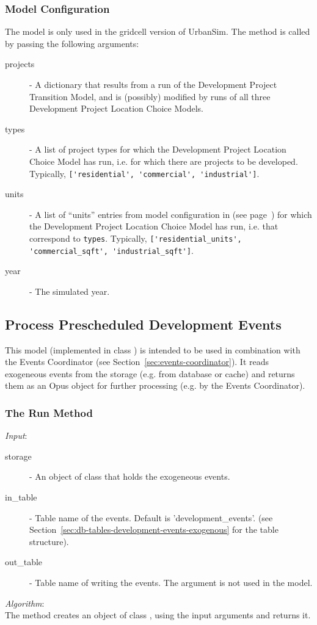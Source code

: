 \subsubsection{Model Configuration}
%
The model is only used in the gridcell version of UrbanSim.
The  method is called by
passing the following arguments:
\begin{description}
\item[projects] - A dictionary that results from a run of the Development
  Project Transition Model,  and is (possibly) modified by runs of all three
  Development Project Location Choice Models. 
\item[types] - A list of project types for which the Development Project
  Location Choice Model has run, i.e. for which there are projects to be
  developed. Typically, \verb|['residential', 'commercial', 'industrial']|.
\item[units] - A list of ``units'' entries from model configuration in
   (see page~\pageref{page:model-configuration}) for which the
  Development Project Location Choice Model has run, i.e. that correspond to
  \verb|types|. Typically, \verb|['residential_units', 'commercial_sqft', 'industrial_sqft']|.
\item[year] - The simulated year.
\end{description}

%
\subsection{Process Prescheduled Development Events}
%
\label{sec:process-prescheduled-development-events}
%
This model (implemented in class  )
is intended to be used in combination with the Events Coordinator (see Section~\ref{sec:events-coordinator}).
It reads exogeneous events from the storage (e.g. from database or cache) and returns them as an Opus object for further
processing (e.g. by the Events Coordinator).

%
\subsubsection{The Run Method}
%
{\it Input}:
\begin{description}
\item[storage] - An object of class  that holds the exogeneous events.
\item[in_table] - Table name of the events. Default is 'development_events'.
(see Section~\ref{sec:db-tables-development-events-exogenous} for the table structure).
\item[out_table] -  Table name of writing the events. The argument is not used in the model.
\end{description}
%
{\it Algorithm}:\\[1mm]
The method creates an object of class , using the 
input arguments and returns it.

